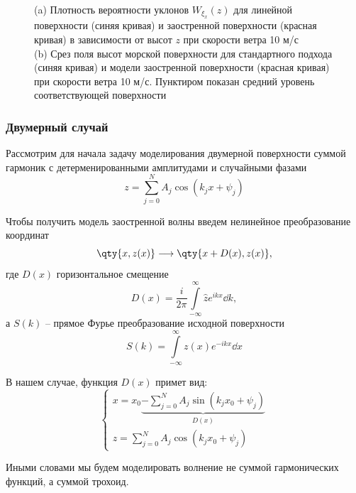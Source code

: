\begin{figure}[h!]
\begin{subfigure}{0.49\linewidth}
        \caption{}
    \end{subfigure}
    \caption{(a) Плотность вероятности уклонов $W_{\xi_x}(z)$ для линейной
        поверхности (синяя кривая) и заостренной поверхности (красная кривая) в
        зависимости от высот $z$ при скорости ветра 10 м/с \\
    (b) Срез поля высот морской поверхности для стандартного подхода (синяя
кривая) и модели заостренной поверхности (красная кривая) при скорости ветра 10
м/с. Пунктиром показан средний уровень соответствующей поверхности}
    \label{fig:pdf}
\end{figure}

\subsubsection{Двумерный случай}%
\label{ssub:odnomernyi_sluchai}

Рассмотрим для начала задачу моделирования двумерной поверхности суммой гармоник с детерменированными амплитудами и случайными фазами
 \begin{equation}
     z = \sum\limits_{j=0}^{N} A_j \cos(k_j x + \psi_j)
 \end{equation}

Чтобы получить модель заостренной волны введем нелинейное преобразование координат
\begin{equation}
    \qty{x,z(x)} \longrightarrow \qty{x + D(x),z(x)},
\end{equation}
где $D(x)$ горизонтальное смещение
\begin{equation}
    D(x) =  \frac{i}{2\pi} \int\limits_{-\infty}^{\infty}   \hat z e^{ikx} \dd{k},
\end{equation}
а $S(k)$ -- прямое Фурье преобразование исходной поверхности
\begin{equation}
    S(k) = \int\limits_{-\infty}^{\infty} z(x) e^{-ikx} \dd x 
\end{equation}

В нашем случае, функция $D(x)$ примет вид: 
\begin{equation}
    \begin{cases}
    x = x_{0} \underbrace{
    - \sum\limits_{j=0}^{N} A_j \sin(k_j x_0 + \psi_j)
    }_{D(x)} \\
    z = \sum\limits_{j=0}^{N} A_j \cos(k_j x_{0} + \psi_j)
    \end{cases}
\end{equation}

Иными словами мы будем моделировать волнение не суммой гармонических функций, а 
суммой трохоид. 


